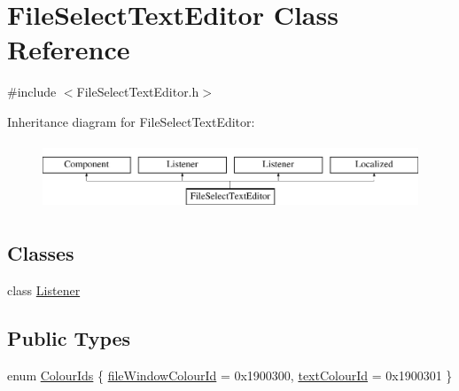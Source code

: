 \hypertarget{classFileSelectTextEditor}{}\section{File\+Select\+Text\+Editor Class Reference}
\label{classFileSelectTextEditor}


{\ttfamily \#include $<$File\+Select\+Text\+Editor.\+h$>$}

Inheritance diagram for File\+Select\+Text\+Editor\+:\begin{figure}[H]
\begin{center}
\leavevmode
\includegraphics[height=2.000000cm]{classFileSelectTextEditor}
\end{center}
\end{figure}
\subsection*{Classes}
\begin{DoxyCompactItemize}
\item 
class \mbox{\hyperlink{classFileSelectTextEditor_1_1Listener}{Listener}}
\end{DoxyCompactItemize}
\subsection*{Public Types}
\begin{DoxyCompactItemize}
\item 
enum \mbox{\hyperlink{classFileSelectTextEditor_abb676904fcaffc31edde4137c91a78df}{Colour\+Ids}} \{ \mbox{\hyperlink{classFileSelectTextEditor_abb676904fcaffc31edde4137c91a78dfadd271bda73efc61905fdd507bbe2d982}{file\+Window\+Colour\+Id}} = 0x1900300, 
\mbox{\hyperlink{classFileSelectTextEditor_abb676904fcaffc31edde4137c91a78dfa6201200efa00cc6295616175209293eb}{text\+Colour\+Id}} = 0x1900301
 \}
\end{DoxyCompactItemize}
